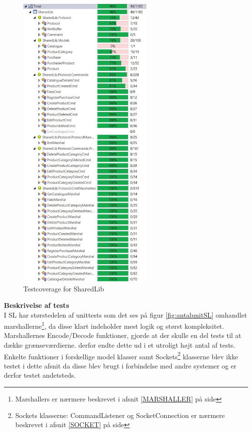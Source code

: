 \begin{figure}[H]
	\centering
	\includegraphics[width=0.60\textwidth]{Test/SharedLib/UnitTests/UCoverUlt.png}
	\caption{Testcoverage for SharedLib}
	\label{fig:coverSL}
\end{figure}


\newpage
\textbf{Beskrivelse af tests}\\
I \gls{SL} har størstedelen af unittests som det ses på figur \ref{fig:antalunitSL} omhandlet marshallerne\footnote{Marshallers er nærmere beskrevet i afsnit \ref{MARSHALLER} på side \pageref{MARSHALLER}}, da disse klart indeholder mest logik og størst kompleksitet. Marshallernes Encode/Decode funktioner, gjorde at der skulle en del tests til at dække grænseværdierne. derfor endte dette ud i et utroligt højt antal af tests. Enkelte funktioner i forskellige model klasser samt Sockets\footnote{Sockets klasserne: CommandListener og SocketConnection er nærmere beskrevet i afsnit \ref{SOCKET} på side \pageref{SOCKET}} klasserne blev ikke testet i dette afsnit da disse blev brugt i forbindelse med andre systemer og er derfor testet andetsteds.